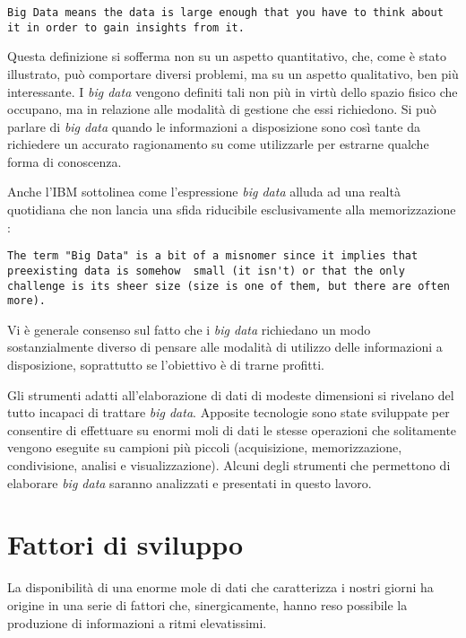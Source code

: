 \begin{lstlisting}[breaklines]
Big Data means the data is large enough that you have to think about it in order to gain insights from it.
\end{lstlisting}

Questa definizione si sofferma non su un aspetto quantitativo, che, come è stato illustrato, può comportare diversi problemi, ma su un aspetto qualitativo, ben più interessante. 
I \textit{big data} vengono definiti tali non più in virtù dello spazio fisico che occupano, ma in relazione alle modalità di gestione che essi richiedono. Si può parlare di \textit{big data} quando 
le informazioni a disposizione sono così tante da richiedere un accurato ragionamento su come utilizzarle per estrarne qualche forma di conoscenza.

Anche l’IBM sottolinea come l’espressione \textit{big data} alluda ad una realtà quotidiana che non lancia una sfida riducibile esclusivamente alla memorizzazione \cite{ibm:def1}:

\begin{lstlisting}[breaklines]
The term "Big Data" is a bit of a misnomer since it implies that preexisting data is somehow  small (it isn't) or that the only challenge is its sheer size (size is one of them, but there are often more).
\end{lstlisting}

Vi è generale consenso sul fatto che i \textit{big data} richiedano un modo sostanzialmente diverso di pensare alle modalità di utilizzo delle informazioni a disposizione, soprattutto se 
l’obiettivo è di trarne profitti.

Gli strumenti adatti all’elaborazione di dati di modeste dimensioni si rivelano del tutto incapaci di trattare \textit{big data}. Apposite tecnologie sono state sviluppate per consentire 
di effettuare su enormi moli di dati le stesse operazioni che solitamente vengono eseguite su campioni più piccoli (acquisizione, memorizzazione, condivisione, analisi e visualizzazione).
Alcuni degli strumenti che permettono di elaborare \textit{big data} saranno analizzati e presentati in questo lavoro.


\section{Fattori di sviluppo}

La disponibilità di una enorme mole di dati che caratterizza i nostri giorni ha origine in una serie di fattori che, sinergicamente, hanno reso possibile la produzione di informazioni 
a ritmi elevatissimi.

